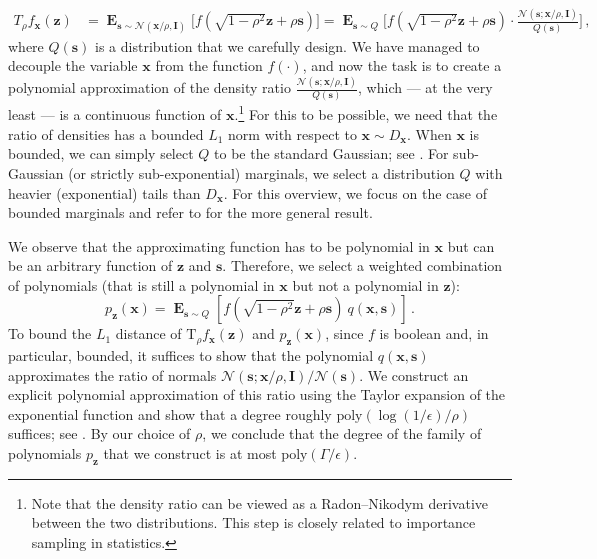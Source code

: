 \documentclass{theoretics}
\renewcommand\vec[1]{\mathbf{#1}}
\DeclareMathOperator*{\E}{\mathbf{E}}
\newcommand{\1}{\Ind}
\begin{document}
\begin{align*}
T_{\rho}f_{\mathbf{x}}(\mathbf{z}) &= \E_{\vec{s}\sim \mathcal{N}(\mathbf{x}/\rho,\mathbf{I})}\bigl[f(\sqrt{1-\rho^2}\mathbf{z}+\rho\vec{s})\bigr]  
= \E_{\vec{s}\sim Q}\biggl[f(\sqrt{1-\rho^2}\mathbf{z}+\rho\vec{s}) \cdot \frac{\mathcal{N}(\vec{s};\mathbf{x}/\rho,\mathbf{I})}{Q(\vec{s})}\biggr] \,,
\end{align*} 
where $Q(\vec{s})$ is a distribution that we carefully design. We have managed to decouple  the variable $\mathbf{x}$ from the function $f(\cdot)$, and now the task is to create a polynomial approximation of the density ratio $\frac{\mathcal{N}(\vec{s};\mathbf{x}/\rho,\mathbf{I})}{Q(\vec{s})}$, which --- at the very least --- is a continuous function of $\mathbf{x}$.\footnote{Note that the density ratio can be viewed as a Radon--Nikodym derivative between the two distributions. This step is closely related to importance sampling in statistics.}
For this to be possible, we need that the ratio of densities has a bounded $L_1$ norm with respect to $\mathbf{x} \sim D_{\mathbf{x}}$. When $\mathbf{x}$ is bounded, we can simply select $Q$ to be the standard Gaussian; see . For sub-Gaussian (or strictly sub-exponential) marginals, we select a distribution $Q$ with heavier (exponential) tails than $D_{\mathbf{x}}$. For this overview, we focus on the case of bounded marginals and refer to  for the more general result.

We observe that the approximating function has to be polynomial in $\mathbf{x}$ but can be an arbitrary function of $\mathbf{z}$ and $\vec{s}$. Therefore, we select a weighted combination of polynomials (that is still a polynomial in $\mathbf{x}$ but not a polynomial in $\mathbf{z}$):
\[
p_{\mathbf{z}}(\mathbf{x}) = \E_{\vec{s}\sim Q}[f(\sqrt{1-\rho^2} \mathbf{z} + \rho \vec{s}) ~ q(\mathbf{x}, \vec{s})]
\,.
\]
To bound the $L_1$ distance of $\text{T}_\rho f_{\mathbf{x}}(\mathbf{z})$ and $p_{\mathbf{z}}(\mathbf{x})$, since $f$ is boolean and, in particular, bounded, it suffices to show that the polynomial $q(\mathbf{x}, \vec{s})$ approximates the ratio of normals $\mathcal{N}(\vec{s}; \mathbf{x}/\rho, \mathbf{I})/\mathcal{N}(\vec{s})$. We construct an explicit polynomial approximation of this ratio using the Taylor expansion of the exponential function and show that a degree roughly $\text{poly}(\log(1/\epsilon)/\rho)$ suffices; see . By our choice of $\rho$, we conclude that the degree of the family of polynomials $p_{\mathbf{z}}$ that we construct is at most $\text{poly}(\Gamma/\epsilon)$.
\end{document}
